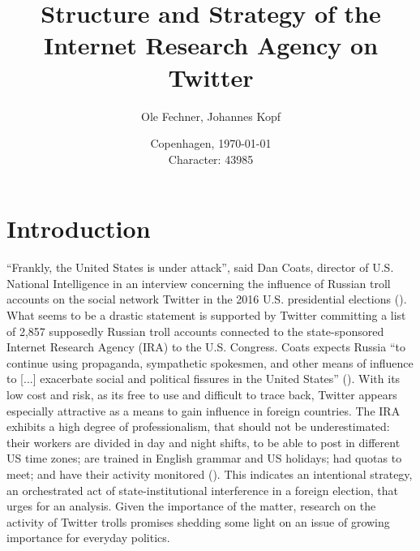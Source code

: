 \documentclass[12pt, titlepage=true, toc=bib]{scrartcl}
\begin{document}
\titlehead{}
\author{Ole Fechner, Johannes Kopf}
\title{Structure and Strategy of the Internet Research Agency on Twitter}


\date{\normalsize{Copenhagen, \today}\\Character: 43985}

\publishers{}


\maketitle[0]

\newpage

\thispagestyle{empty}
\tableofcontents

\newpage

\thispagestyle{empty}
\listoftables

\newpage

\thispagestyle{empty}
\listoffigures

\newpage
\setcounter{page}{1}

\section{Introduction}

``Frankly, the United States is under attack'', said Dan Coats, director of U.S. National Intelligence in an interview concerning the influence of Russian troll accounts on the social network Twitter in the 2016 U.S. presidential elections (\cite{popken_twitter_2018}). What seems to be a drastic statement is supported by Twitter committing a list of 2,857 supposedly Russian troll accounts connected to the state-sponsored Internet Research Agency (IRA) to the U.S. Congress. Coats expects Russia ``to continue using propaganda, sympathetic spokesmen, and other means of influence to [...] exacerbate social and political fissures in the United States'' (\cite{popken_twitter_2018}). With its low cost and risk, as its free to use and difficult to trace back, Twitter appears especially attractive as a means to gain influence in foreign countries. The IRA exhibits a high degree of professionalism, that should not be underestimated: their workers are divided in day and night shifts, to be able to post in different US time zones; are trained in English grammar and US holidays; had quotas to meet; and have their activity monitored (\cite{kirby_what_2018}). This indicates an intentional strategy, an orchestrated act of state-institutional interference in a foreign election, that urges for an analysis. Given the importance of the matter, research on the activity of Twitter trolls promises shedding some light on an issue of growing importance for everyday politics.
\end{document}
